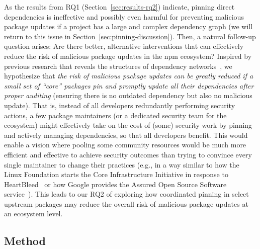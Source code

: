 As the results from RQ1  (Section~\ref{sec:results-rq2}) indicate, pinning direct dependencies is ineffective and possibly even harmful for preventing malicious package updates if a project has a large and complex dependency graph (we will return to this issue in Section~\ref{sec:pinning-discussion}). 
Then, a natural follow-up question arises: Are there better, alternative interventions that can effectively reduce the risk of malicious package updates in the npm ecosystem?
Inspired by previous research that reveals the structures of dependency networks~\cite{DBLP:journals/ese/DecanMG19, DBLP:conf/uss/ZimmermannSTP19}, we hypothesize that \emph{the risk of malicious package updates can be greatly reduced if a small set of ``core'' packages pin and promptly update all their dependencies after proper auditing} (ensuring there is no outdated dependency but also no malicious update).
That is, instead of all developers redundantly performing security actions, a few package maintainers (or a dedicated security team for the ecosystem) might effectively take on the cost of (some) security work by pinning and actively managing dependencies, so that all developers benefit. This would enable a vision where pooling some community resources would be much more efficient and effective to achieve security outcomes than trying to convince every single maintainer to change their practices (e.g., in a way similar to how the Linux Foundation starts the Core Infrastructure
Initiative in response to HeartBleed~\cite{DBLP:conf/msr/Walden20} or how Google provides the Assured Open Source Software service~\cite{assured-open-source}).
This leads to our RQ2 of exploring how coordinated pinning in select upstream packages may reduce the overall risk of malicious package updates at an ecosystem level.

\subsection{Method}
\label{sec:method-rq3}

